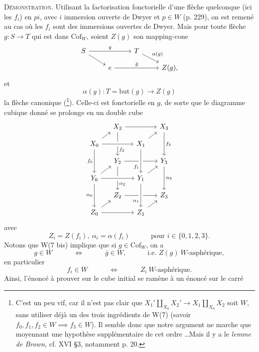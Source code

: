 \documentclass[11pt]{article}
\newcommand{\printedpage}[1]{\marginpar{\footnotesize p.~#1}}
\newcommand{\msp}[1]{\marginpar{\footnotesize [#1]}}
\newcommand{\Cof}{\mathrm{Cof}}
\begin{document}
\textsc{Démonstration.} Utilisant la factorisation
\printedpage{173}
\msp{page 266}
fonctorielle d'une flèche quelconque (ici les $f_i$) en $pi$, avec $i$ immersion ouverte de Dwyer et $p \in W$ (p. 229), on est remené au cas où les $f_i$ sont des immersions ouvertes de Dwyer. Mais pour toute flèche $g : S \longrightarrow T$ qui est dans $\Cof_W$, soient $Z(g)$ son mapping-cone %
\[
\begin{tikzcd}[row sep=small]
S \arrow[rr, "g"] \arrow[dr] & & T \arrow[dr, "\alpha(g)"] & \\
 & e \arrow[rr, "\bar{g}"] & & Z(g),
\end{tikzcd}
\]
et
\[
\alpha(g) : T = \mathrm{but}(g) \longrightarrow Z(g)
\]
la flèche canonique (\footnote[136]{C'est un peu vif, car il n'est pas clair que $X_1' \amalg_{X_0} X_2' \longrightarrow X_1 \amalg_{X_0} X_2$ soit $W$, sans utiliser déjà un des trois ingrédients de W(7) (savoir $f_0, f_1, f_2 \in W \implies f_3 \in W$). Il semble donc que notre argument ne marche que moyennant une hypothèse supplémentaire de cet ordre \dots Mais il y a le \textit{lemme de Brown,} cf. XVI \S3, notamment p. 20.}). Celle-ci est fonctorielle en $g$, de sorte que le diagramme cubique donné se prolonge en un double cube
\[
\begin{tikzcd}[row sep=small, column sep=small]
 & X_2 \arrow[rr] \arrow[dd, "f_2" near end] & & X_3 \arrow[dd, "f_3"] \\
X_0 \arrow[ur] \arrow[rr, crossing over] \arrow[dd, "f_0"'] & & X_1 \arrow[ur] & \\
 & Y_2 \arrow[rr] \arrow[dd, "\alpha_2" near end] & & Y_3 \arrow[dd, "\alpha_3"] \\
Y_0 \arrow[ur] \arrow[rr, crossing over] \arrow[dd, "\alpha_0"'] & & Y_1 \arrow[ur] \arrow[from=uu, crossing over, "f_1"' near end] & \\
 & Z_2 \arrow[rr] & & Z_3 \\
Z_0 \arrow[ur] \arrow[rr] & & Z_1 \arrow[ur] \arrow[from=uu, crossing over, "\alpha_1"' near end] &
\end{tikzcd}
\]
avec
\[
Z_i = Z(f_i),\ \alpha_i = \alpha(f_i) \qquad\quad \text{pour } i \in \{0,1,2,3\}.
\]
Notons que W(7 bis) implique que si $g \in \Cof_W$,
\msp{page 267}
on a
\[
g \in W \qquad\quad \iff \qquad\quad \bar{g} \in W, \qquad\quad \text{i.e. } Z(g)\ W\text{-asphérique},
\]
en particulier
\[
f_i \in W \qquad\quad \iff \qquad\quad Z_i\ W\text{-asphérique}.
\]
Ainsi, l'énoncé à prouver sur le cube initial se ramène à un énoncé sur le carré
\printedpage{174}
\end{document}
